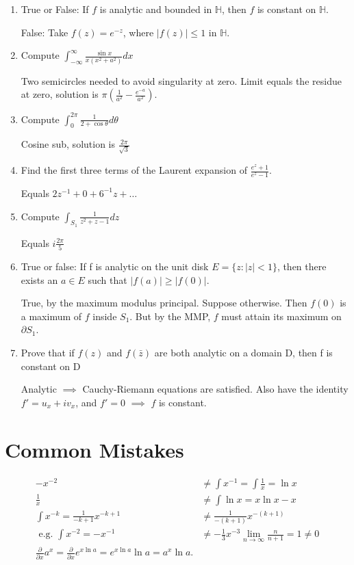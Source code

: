 \begin{enumerate}
\def\labelenumi{\arabic{enumi}.}
\item
  True or False: If \(f\) is analytic and bounded in \(\mathbb{H}\),
  then \(f\) is constant on \(\mathbb{H}\).

  False: Take \(f(z) = e^{-z}\), where \(|f(z)| \leq 1\) in
  \(\mathbb{H}\).
\item
  Compute \(\int_{-\infty}^{\infty} \frac{\sin x}{x(x^2+a^2)}dx\)

  Two semicircles needed to avoid singularity at zero. Limit equals the
  residue at zero, solution is
  \(\pi (\frac{1}{a^2} - \frac{e^{-a}}{a^2})\).
\item
  Compute \(\int_0^{2\pi} \frac{1}{2+\cos\theta}d\theta\)

  Cosine sub, solution is \(\frac{2\pi}{\sqrt{3}}\)
\item
  Find the first three terms of the Laurent expansion of
  \(\frac{e^z+1}{e^z-1}\).

  Equals \(2z^{-1} + 0 + 6^{-1}z + \ldots\)
\item
  Compute \(\int_{S_1} \frac{1}{z^2+z-1}dz\)

  Equals \(i\frac{2\pi}{5}\)
\item
  True or false: If f is analytic on the unit disk
  \(E = \{z : |z| < 1\}\), then there exists an \(a \in E\) such that
  \(|f (a)| \geq |f (0)|\).

  True, by the maximum modulus principal. Suppose otherwise. Then
  \(f(0)\) is a maximum of \(f\) inside \(S_1\). But by the MMP, \(f\)
  must attain its maximum on \(\partial S_1\).
\item
  Prove that if \(f(z)\) and \(f (\bar{z})\) are both analytic on a
  domain D, then f is constant on D

  Analytic \(\implies\) Cauchy-Riemann equations are satisfied. Also
  have the identity \(f' = u_x + iv_x\), and \(f' = 0\) \(\implies\)
  \(f\) is constant.
\end{enumerate}

\hypertarget{common-mistakes}{%
\section{Common Mistakes}\label{common-mistakes}}

\begin{align*}
-x^{-2} &\neq \int x^{-1} = \int \frac{1}{x} = \ln x \\ 
\frac{1}{x} &\neq \int \ln x = x\ln x - x \\
\int x^{-k} = \frac{1}{-k+1}x^{-k+1} &\neq \frac{1}{-(k+1)}x^{-(k+1)} \\
\text{ e.g. } \int x^{-2} = -x^{-1} &\neq -\frac{1}{3}x^{-3}
\lim_{n\to\infty} \frac{n}{n+1} = 1 \neq 0\\
\frac{\partial}{\partial x}a^x = \frac{\partial}{\partial x}e^{x\ln a} = e^{x\ln a} \ln a = a^x \ln a.
\end{align*}

